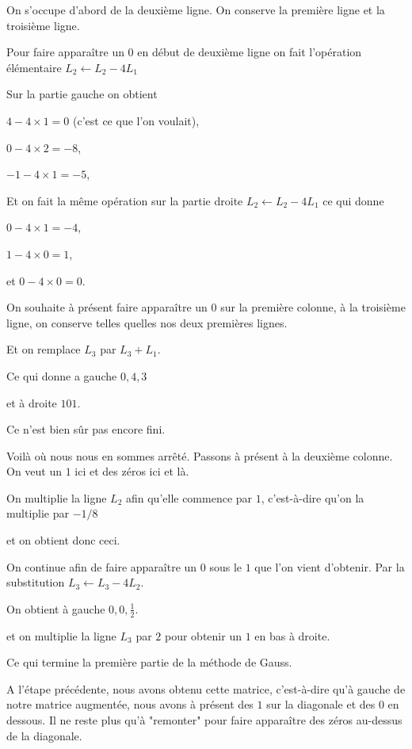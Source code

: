 \change
On s'occupe d'abord de la deuxième ligne. On conserve la première ligne 
et la troisième ligne.

\change
Pour faire apparaître un $0$ en début de deuxième ligne on fait 
l'opération élémentaire
$L_2 \leftarrow L_2 - 4 L_1$ 


\change
Sur la partie gauche on obtient 

$4-4\times1=0$ (c'est ce que l'on voulait), 

$0-4\times2 =-8$, 

$-1-4\times1 =-5$, 

\change
Et on fait la même opération sur la partie droite $L_2 \leftarrow L_2 - 4 L_1$ 
ce qui donne 

$0-4\times1 =-4$, 

$1-4\times0 =1$, 

et $0-4\times 0=0$.

\change
On souhaite à présent faire apparaître un $0$ sur la première colonne, à la troisième ligne, 
on conserve telles quelles nos deux premières lignes.

\change
Et on remplace $L_3$ par $L_3 + L_1$.

\change
Ce qui donne a gauche $0,4,3$ 

\change
et à droite $1 0 1$.

Ce n'est bien sûr pas encore fini.

\diapo

Voilà où nous nous en sommes arrêté. Passons à présent à la deuxième colonne.
On veut un $1$ ici et des zéros ici et là.

\change
On multiplie la ligne $L_2$ afin qu'elle commence par $1$, c'est-à-dire qu'on la multiplie par $-1/8$

\change
et on obtient donc ceci.

\change
On continue afin de faire apparaître un $0$ sous le $1$ que l'on vient d'obtenir.
Par la substitution $L_3 \leftarrow L_3 -4L_2$.

\change
On obtient à gauche $0, 0, \frac12$.


\change
et on multiplie la ligne $L_3$ par $2$ pour obtenir un $1$ en bas à droite.

\change
Ce qui termine la première partie de la méthode de Gauss.


\diapo

A l'étape précédente, nous avons obtenu cette matrice, c'est-à-dire qu'à gauche de notre matrice augmentée, nous avons à présent des $1$ sur la diagonale et des $0$ en dessous. Il ne reste plus qu'à "remonter" pour faire apparaître des zéros au-dessus de la diagonale.

